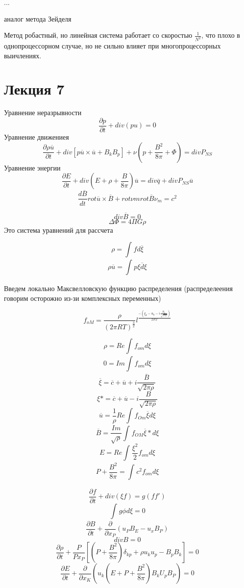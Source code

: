 \documentclass{article}
\begin{document}
...


аналог метода Зейделя

Метод робастный, но линейная система работает со скоростью $ \frac{1}{N^2} $, что плохо в однопроцессорном случае, но не сильно влияет при многопроцессорных выичлениях.

\section{Лекция 7 }

Уравнение неразрывности
\[ \frac{\partial p}{ \partial  t} + div ( pu ) = 0 \]
Уравнение движениея
\[ \frac{\partial  \rho \overline{u}}{\partial t} + div [ p \overline{u} \times \overline{u} + B_k B_p] + \nu (p + \frac{B^2}{8 \pi} + \Phi) = div P_{NS} \]
Уравнение энергии
\[ \frac{\partial E}{\partial t} + div (E + \rho + \frac{B}{8\pi}) \overline{u} = div \overline{q} + div P_{NS} \overline{u} \]
\[ \frac{d \overline{B}}{dt} rot \overline{u} \times \overline{B} + rot \nu m rot \overline{B} \nu_m = c^2\]

\[ div \overline{B} = 0 \]
\[ \Delta \Phi = 4\Pi G \rho \]
Это система уравнений для рассчета 

\[ \rho = \int_{}^{}f d \overline{\xi} \]
\[ \rho \overline{u} = \int_{}^{} p \overline{\xi d \xi} \]

Введем локально Максвелловскую функцию распределения (распределеения говорим осторожно из-зи комплексных переменных)

\[ f_{oM} = \frac{\rho}{ (2 \pi R T)^{\frac{3}{2}}} l^{\frac{-(\xi_k - u_k - i \frac{B_k}{\sqrt{4 \pi \rho}})}{2RT}} \]

\[ \rho = Re \int_{}^{} f_{om} d \xi \]
\[ 0 = Im \int_{}^{}f_{om} d\xi \]
\[ \overline{\xi} = \overline{c} + \overline{u} + i \frac{\overline{B}}{\sqrt{2 \pi \rho}} \]
\[ \xi* = \overline{c} + \overline{u} - i \frac{B}{\sqrt{2 \pi \rho}} \]
\[ \overline{u} = \frac{1}{\rho} Re \int_{}^{} f_{Om} \overline{\xi} d\xi \]
\[ \overline{B} = \frac{Im}{\sqrt{\rho}} \int_{}^{} f_{OM} \overline{\xi} * d \xi \]
\[ E = Re \int_{}^{} \frac{\xi^2}{2} f_{om} d \xi \]
\[ P + \frac{B^2}{8 \pi} = \int_{}^{}c^2 f_{om} d \xi \]

\[ \frac{\partial f}{\partial t} + div(\xi f) = g(f f') \]
\[ \int_{}^{}g \phi d \xi = 0 \]
\[ \frac{\partial B}{\partial t} + \frac{\partial }{\partial  x_P}(u_P B_E - u_x B_P) \]
\[ div B = 0 \]
\[ \frac{\partial \rho}{\partial t}+\frac{P}{Px_P} [ (P + \frac{B^2}{8 \pi}) \delta_{kp} + \rho u_k u_p - B_p B_k] = 0 \]
\[ \frac{\partial E}{\partial t} + \frac{\partial }{\partial  x_K} (u_k ( E + P + \frac{B^2}{8 \pi}) B_k U_p B_P) = 0 \]
\end{document}
